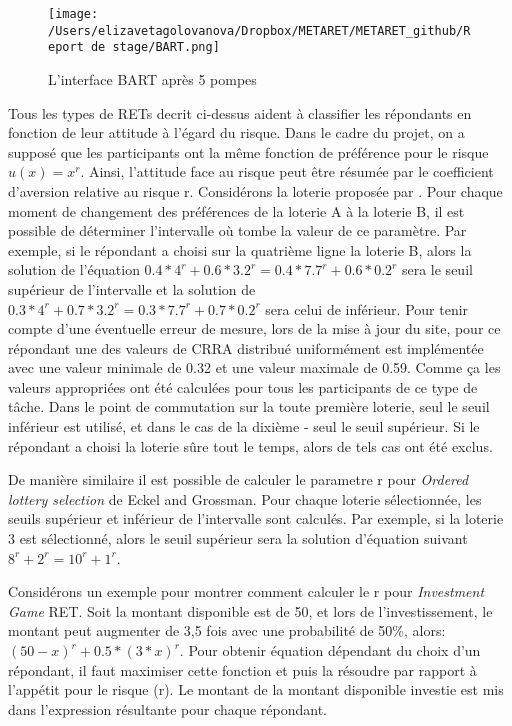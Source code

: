 \documentclass[12pt]{article}
\begin{document}
\begin{figure}
\centering
\texttt{[image: /Users/elizavetagolovanova/Dropbox/METARET/METARET\_github/Report de stage/BART.png]}
\caption{L'interface BART après 5 pompes}
\end{figure}

Tous les types de RETs decrit ci-dessus aident à classifier les
répondants en fonction de leur attitude à l'égard du risque. Dans le
cadre du projet, on a supposé que les participants ont la même fonction
de préférence pour le risque \(u(x) = x^r\). Ainsi, l'attitude face au
risque peut être résumée par le coefficient d'aversion relative au
risque r. Considérons la loterie proposée par \citet{Holt2002}. Pour
chaque moment de changement des préférences de la loterie A à la loterie
B, il est possible de déterminer l'intervalle où tombe la valeur de ce
paramètre. Par exemple, si le répondant a choisi sur la quatrième ligne
la loterie B, alors la solution de l'équation
\(0.4*4^r + 0.6*3.2^r = 0.4*7.7^r + 0.6*0.2^r\) sera le seuil supérieur
de l'intervalle et la solution de
\(0.3*4^r + 0.7*3.2^r = 0.3*7.7^r + 0.7*0.2^r\) sera celui de inférieur.
Pour tenir compte d'une éventuelle erreur de mesure, lors de la mise à
jour du site, pour ce répondant une des valeurs de CRRA distribué
uniformément est implémentée avec une valeur minimale de 0.32 et une
valeur maximale de 0.59. Comme ça les valeurs appropriées ont été
calculées pour tous les participants de ce type de tâche. Dans le point
de commutation sur la toute première loterie, seul le seuil inférieur
est utilisé, et dans le cas de la dixième - seul le seuil supérieur. Si
le répondant a choisi la loterie sûre tout le temps, alors de tels cas
ont été exclus.

De manière similaire il est possible de calculer le parametre r pour
\emph{Ordered lottery selection} de Eckel and Grossman. Pour chaque
loterie sélectionnée, les seuils supérieur et inférieur de l'intervalle
sont calculés. Par exemple, si la loterie 3 est sélectionné, alors le
seuil supérieur sera la solution d'équation suivant
\(8^r + 2^r = 10^r + 1^r\).

Considérons un exemple pour montrer comment calculer le r pour
\emph{Investment Game} RET. Soit la montant disponible est de 50, et
lors de l'investissement, le montant peut augmenter de 3,5 fois avec une
probabilité de 50\%, alors: \((50 - x)^r + 0.5 * (3 * x)^r\). Pour
obtenir équation dépendant du choix d'un répondant, il faut maximiser
cette fonction et puis la résoudre par rapport à l'appétit pour le
risque (r). Le montant de la montant disponible investie est mis dans
l'expression résultante pour chaque répondant.
\end{document}
